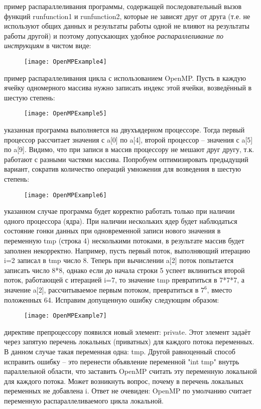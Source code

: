 {	 пример распараллеливания программы, содержащей последовательный вызов функций run\textunderscore function1 и run\textunderscore function2, которые не зависят друг от друга (т.е. не используют общих данных и результаты работы одной не влияют на результаты работы другой) и поэтому допускающих удобное \textit{распараллеливание по инструкциям} в чистом виде:
	\begin{figure}[H]
		\texttt{[image: OpenMPExample4]}
	\end{figure}
	 пример распараллеливания цикла с использованием OpenMP. Пусть в каждую ячейку одномерного массива нужно записать индекс этой ячейки, возведённый в шестую степень:
	\begin{figure}[H]
		\texttt{[image: OpenMPExample5]}
	\end{figure}
	 указанная программа выполняется на двухъядерном процессоре. Тогда первый процессор рассчитает значения с a[0] по a[4], второй процессор – значения с a[5] по a[9]. Видимо, что при записи в массив процессору не мешают друг другу, т.к. работают с разными частями массива. Попробуем оптимизировать предыдущий вариант, сократив количество операций умножения для возведения в шестую степень:
	\begin{figure}[H]
		\texttt{[image: OpenMPExample6]}
	\end{figure}
	 указанном случае программа будет корректно работать только при наличии одного процессора (ядра). При наличии нескольких ядер будет наблюдаться состояние гонки данных при одновременной записи нового значения в переменную tmp (строка 4) несколькими потоками, в результате массив будет заполнен некорректно. Например, пусть первый поток, выполняющий итерацию i=2 записал в tmp число 8. Теперь при вычислении a[2] поток попытается записать число 8*8, однако если до начала строки 5 успеет вклиниться второй поток, работающей с итерацией i=7, то значение tmp превратиться в 7*7*7, а значение a[2], рассчитываемое первым потоком, превратиться в $7^6$, вместо положенных 64. Исправим допущенную ошибку следующим образом:
	\begin{figure}[H]
		\texttt{[image: OpenMPExample7]}
	\end{figure}
	 директиве препроцессору появился новый элемент: private. Этот элемент задаёт через запятую перечень локальных (приватных) для каждого потока переменных. В данном случае такая переменная одна: tmp. Другой равноценный способ исправить ошибку – это перенести объявление переменной "int tmp" внутрь параллельной области, что заставить OpenMP считать эту переменную локальной для каждого потока. Может возникнуть вопрос, почему в перечень локальных переменных не добавлена i. Ответ не очевиден: OpenMP по умолчанию считает переменную распараллеливаемого цикла локальной.
}
